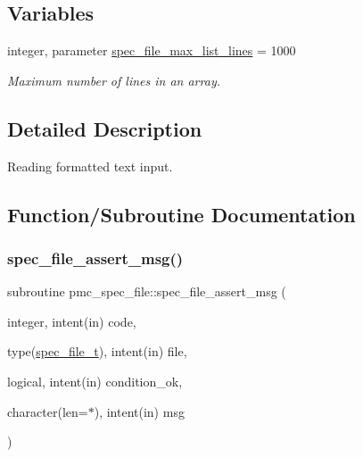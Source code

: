 \subsection*{Variables}
\begin{DoxyCompactItemize}
\item 
integer, parameter \mbox{\hyperlink{namespacepmc__spec__file_a5297f39208d828141ed9b268484360a5}{spec\+\_\+file\+\_\+max\+\_\+list\+\_\+lines}} = 1000
\begin{DoxyCompactList}\small\item\em Maximum number of lines in an array. \end{DoxyCompactList}\end{DoxyCompactItemize}


\subsection{Detailed Description}
Reading formatted text input. 

\subsection{Function/\+Subroutine Documentation}
\mbox{\label{namespacepmc__spec__file_a5aa135a96d6a58a77a3b662942666146}} 
\subsubsection{\texorpdfstring{spec\+\_\+file\+\_\+assert\+\_\+msg()}{spec\_file\_assert\_msg()}}
{\footnotesize\ttfamily subroutine pmc\+\_\+spec\+\_\+file\+::spec\+\_\+file\+\_\+assert\+\_\+msg (\begin{DoxyParamCaption}\item[{integer, intent(in)}]{code,  }\item[{type(\mbox{\hyperlink{structpmc__spec__file_1_1spec__file__t}{spec\+\_\+file\+\_\+t}}), intent(in)}]{file,  }\item[{logical, intent(in)}]{condition\+\_\+ok,  }\item[{character(len=$\ast$), intent(in)}]{msg }\end{DoxyParamCaption})}



